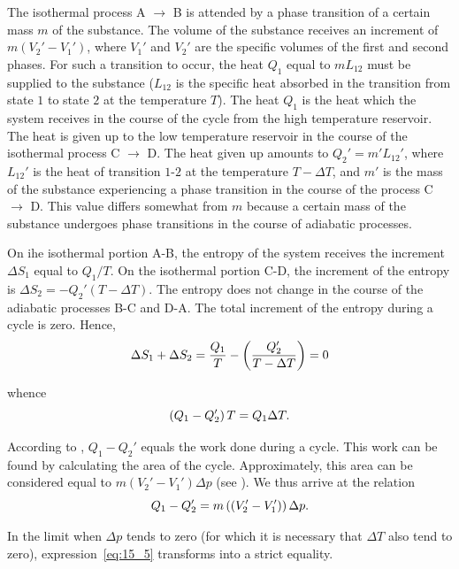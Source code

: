 The isothermal process A $\to$ B is attended by a phase transition of a certain mass $m$ of the substance. The volume of the substance receives an increment of $m(V_2'-V_1')$, where $V_1'$ and $V_2'$ are the specific volumes of the first and second phases. For such a transition to occur, the heat $Q_1$ equal to $mL_{12}$ must be supplied to the substance ($L_{12}$ is the specific heat absorbed in the transition from state $1$ to state $2$ at the temperature $T$). The heat $Q_1$ is the heat which the system receives in the course of the cycle from the high temperature reservoir. The heat is given up to the low temperature reservoir in the course of the isothermal process C $\to$ D.
The heat given up amounts to $Q_2'=m'L_{12}'$, where $L_{12}'$ is the heat of transition $1$-$2$ at the temperature $T-\Delta T$, and $m'$ is the mass of the substance experiencing a phase transition in the course of the process C $\to$ D. This value differs somewhat from $m$ because a certain mass of the substance undergoes phase transitions in the course of adiabatic processes.

On ihe isothermal portion A-B, the entropy of the system receives the increment $\Delta S_1$ equal to $Q_1/T$. On the isothermal portion C-D, the increment of the entropy is $\Delta S_2=-Q_2'(T-\Delta T)$. The entropy does not change in the course of the adiabatic processes B-C and D-A. The total increment of the entropy during a cycle is zero. Hence,
\begin{equation*}
    \Delta S_1 + \Delta S_2 = \frac{Q_1}{T} - \left(\frac{Q_2'}{T-\Delta T}\right) = 0
\end{equation*}

\noindent
whence
\begin{equation}\label{eq:15_4}
    \left(Q_1 - Q_2'\right)T = Q_1 \Delta T.
\end{equation}

According to , $Q_1-Q_2'$ equals the work done during a cycle. This work can be found by calculating the area of the cycle. Approximately, this area can be considered equal to $m(V_2'-V_1')\Delta p$ (see ). We thus arrive at the relation
\begin{equation}\label{eq:15_5}
    Q_1 - Q_2' = m\left((V_2'-V_1')\right)\Delta p.
\end{equation}

\noindent
In the limit when $\Delta p$ tends to zero (for which it is necessary that $\Delta T$ also tend to zero), expression~\eqref{eq:15_5} transforms into a strict equality.

